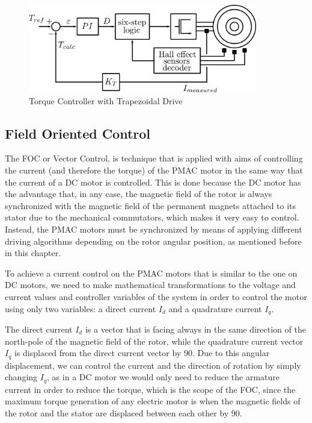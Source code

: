 \begin{figure}[htbp]
\centering
\includegraphics[width=10cm]{Images/torque_trapezoidal.png} 
\caption[Torque Controller with Trapezoidal Drive]{Torque Controller with Trapezoidal Drive}
\label{fig:torque_trapezoidal}
\end{figure}

\subsection{Field Oriented Control}\label{sub:FOC}

The \acf{FOC} or Vector Control, is technique that is applied with aims of controlling the current (and therefore the torque) of the \ac{PMAC} motor in the same way that the current of a \ac{DC} motor is controlled. This is done because the \ac{DC} motor has the advantage that, in any case, the magnetic field of the rotor is always synchronized with the magnetic field of the permanent magnets attached to its stator due to the mechanical commutators, which makes it very easy to control. Instead, the \ac{PMAC} motors must be synchronized by means of applying different driving algorithms depending on the rotor angular position, as mentioned before in this chapter. 

To achieve a current control on the \ac{PMAC} motors that is similar to the one on \ac{DC} motors, we need to make mathematical transformations to the voltage and current values and controller variables of the system in order to control the motor using only two variables: a direct current $I_{d}$ and a quadrature current $I_{q}$.

The direct current $I_{d}$ is a vector that is facing always in the same direction of the north-pole of the magnetic field of the rotor, while the quadrature current vector $I_{q}$ is displaced from the direct current vector by 90\degree. Due to this angular displacement, we can control the current and the direction of rotation by simply changing $I_{q}$, as in a \ac{DC} motor we would only need to reduce the armature current in order to reduce the torque, which is the scope of the \ac{FOC}, since the maximum torque generation of any electric motor is when the magnetic fields of the rotor and the stator are displaced between each other by 90\degree.

